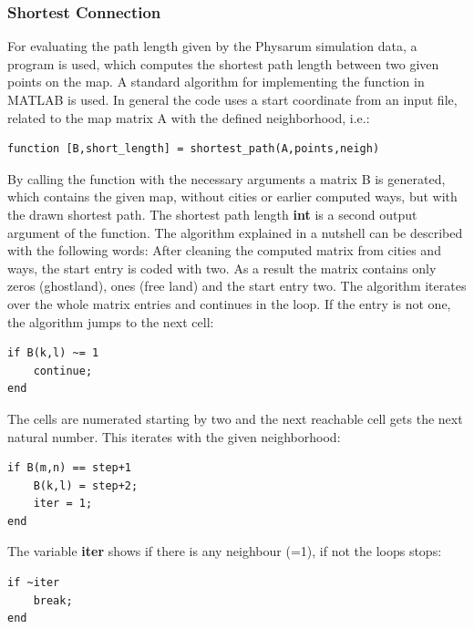 \documentclass[11pt]{scrartcl}
\begin{document}
\subsubsection{Shortest Connection}
\label{sec:shortest_connection}
For evaluating the path length given by the Physarum simulation data, a program is used, which computes the shortest path length between two given points on the map. A standard algorithm \cite{gaertner2010} for implementing the function in MATLAB is used. In general the code uses a start coordinate from an input file, related to the map matrix A with the defined neighborhood, i.e.:

\begin{lstlisting}
function [B,short_length] = shortest_path(A,points,neigh)
\end{lstlisting}

\null

By calling the function with the necessary arguments a matrix B is generated, which contains the given map, without cities or earlier computed ways, but with the drawn shortest path. The shortest path length \textbf{int} is a second output argument of the function. The algorithm explained in a nutshell can be described with the following words: After cleaning the computed matrix from cities and ways, the start entry is coded with two. As a result the matrix contains only zeros (ghostland), ones (free land) and the start entry two. The algorithm iterates over the whole matrix entries and continues in the loop. If the entry is not one, the algorithm jumps to the next cell:

\begin{lstlisting}
if B(k,l) ~= 1
	continue;
end
\end{lstlisting}

\null

The cells are numerated starting by two and the next reachable cell gets the next natural number. This iterates with the given neighborhood:

\begin{lstlisting}
if B(m,n) == step+1
	B(k,l) = step+2;
	iter = 1;
end
\end{lstlisting}

\null

The variable \textbf{iter} shows if there is any neighbour (=1), if not the loops stops:

\begin{lstlisting}
if ~iter
	break;
end
\end{lstlisting}
\end{document}
